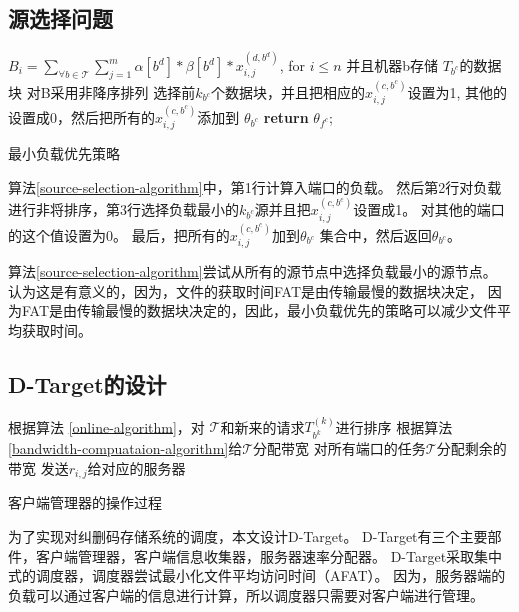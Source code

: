 \subsection{源选择问题}
\begin{algorithm}
$B_i= \sum_{\forall b \in \mathcal{T}}\sum_{j=1}^{m}\alpha[b^d]*\beta[b^d]*x_{i,j}^{(d,b^d)}$, for $i \le n$ 并且机器b存储 $T_{b^c}$的数据块\;
对B采用非降序排列\;  
选择前$k_{b^c}$个数据块，并且把相应的$x_{i,j}^{(c,b^c)}$设置为1, 其他的设置成0，然后把所有的$x_{i,j}^{(c,b^c)}$添加到 $\theta_{b^c}$\;
\textbf{return} $\theta_{f^c}$;
\caption{最小负载优先策略}
\label{source-selection-algorithm}
\end{algorithm}

算法\ref{source-selection-algorithm}中，第1行计算入端口的负载。
然后第2行对负载进行非将排序，第3行选择负载最小的$k_{b^c}$源并且把$x_{i,j}^{(c,b^c)}$设置成1。
对其他的端口的这个值设置为0。
最后，把所有的$x_{i,j}^{(c,b^c)}$加到$\theta_{b^c}$ 集合中，然后返回$\theta_{b^c}$。

算法\ref{source-selection-algorithm}尝试从所有的源节点中选择负载最小的源节点。
认为这是有意义的，因为，文件的获取时间FAT是由传输最慢的数据块决定，
因为FAT是由传输最慢的数据块决定的，因此，最小负载优先的策略可以减少文件平均获取时间。 


\subsection{D-Target的设计}
\begin{algorithm}
根据算法 \ref{online-algorithm}，对 $\mathcal{T}$和新来的请求$T^{(k)}_{b^k}$进行排序\;
根据算法 \ref{bandwidth-compuataion-algorithm}给$\mathcal{T}$分配带宽\;
对所有端口的任务$\mathcal{T}$分配剩余的带宽\;
发送$r_{i,j}$给对应的服务器\;
\caption{客户端管理器的操作过程}
\label{scheduler}
\end{algorithm}
为了实现对纠删码存储系统的调度，本文设计D-Target。
D-Target有三个主要部件，客户端管理器，客户端信息收集器，服务器速率分配器。
D-Target采取集中式的调度器，调度器尝试最小化文件平均访问时间（AFAT）。
因为，服务器端的负载可以通过客户端的信息进行计算，所以调度器只需要对客户端进行管理。
